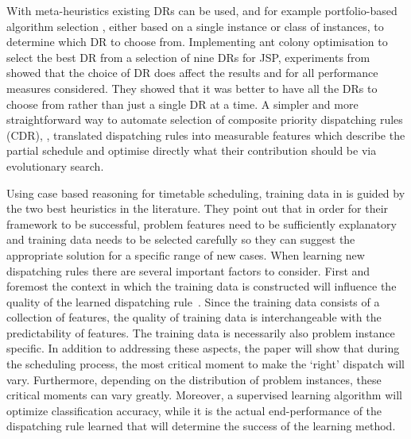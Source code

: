 \documentclass[twocolumn]{svjour3}
\newcommand{\dr}{dispatching rule}
\newcommand{\cdr}{composite priority \dr}
\begin{document}
With meta-heuristics existing DRs can be used, and for example 
portfolio-based algorithm selection \cite{Rice76,Gomes01,Xu07}, either based on 
a single instance or class of instances, to determine which DR to choose from. 
Implementing ant colony optimisation to select the best DR 
from a selection of nine DRs for JSP, experiments from \cite{Korytkowski13} 
showed that the choice of DR does affect the results and for all performance 
measures considered. They showed that it was better to have all the DRs to 
choose from rather than just a single DR at a time.
%
A simpler and more straightforward way to automate selection of \cdr s (CDR), 
\cite{InRu14}, translated \dr s into measurable features which describe the 
partial schedule and optimise directly what their contribution should be via 
evolutionary search. 

Using case based reasoning for timetable scheduling, training data in 
\cite{Burke06} is guided by the two best heuristics in the literature.
They point out that in order for their framework to be successful, problem 
features need to be sufficiently explanatory and training data needs to be 
selected carefully so they can suggest the appropriate solution for a specific 
range of new cases. 
%
When learning new \dr s there are several important 
factors to consider. First and foremost the context in which the training data 
is constructed 
will influence the quality of the learned \dr\ \cite{Burke06}. 
Since the training data consists of a collection of features, the quality of 
training data is interchangeable with the predictability of features. 
The training data is necessarily also problem instance specific. %
In addition to addressing these aspects, the paper will show that during 
the scheduling process, the most critical moment to make the `right' dispatch 
will vary. Furthermore, depending on the distribution of problem 
instances, these critical moments can vary greatly. 
Moreover, a supervised learning algorithm will optimize classification 
accuracy, while it is the actual end-performance of the dispatching rule 
learned that will determine the success of the learning method. 
\end{document}
